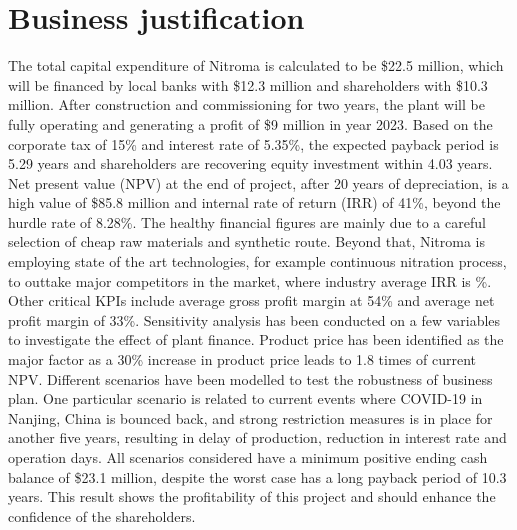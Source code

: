 \section*{Business justification}


The total capital expenditure of Nitroma is calculated to be \$22.5 million, which will be financed by local banks with \$12.3 million and shareholders with \$10.3 million. After construction and commissioning for two years, the plant will be fully operating and generating a profit of \$9 million in year 2023. Based on the corporate tax of 15\% and interest rate of 5.35\%, the expected payback period is 5.29 years and shareholders are recovering equity investment within 4.03 years. Net present value (NPV) at the end of project, after 20 years of depreciation, is a high value of \$85.8 million and internal rate of return (IRR) of 41\%, beyond the hurdle rate of 8.28\%. The healthy financial figures are mainly due to a careful selection of cheap raw materials and synthetic route. Beyond that, Nitroma is employing state of the art technologies, for example continuous nitration process, to outtake major competitors in the market, where industry average IRR is \%. Other critical KPIs include average gross profit margin at 54\% and average net profit margin of 33\%. 
Sensitivity analysis has been conducted on a few variables to investigate the effect of plant finance. Product price has been identified as the major factor as a 30\% increase in product price leads to 1.8 times of current NPV. Different scenarios have been modelled to test the robustness of business plan. One particular scenario is related to current events where COVID-19 in Nanjing, China is bounced back, and strong restriction measures is in place for another five years, resulting in delay of production, reduction in interest rate and operation days. All scenarios considered have a minimum positive ending cash balance of \$23.1 million, despite the worst case has a long payback period of 10.3 years. This result shows the profitability of this project and should enhance the confidence of the shareholders.
